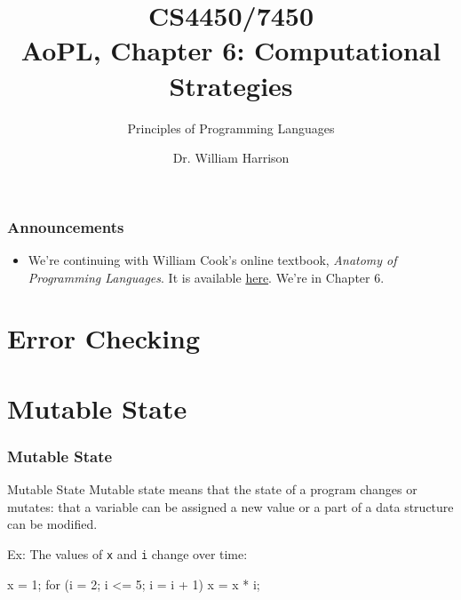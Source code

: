 \documentclass[xcolor=pdftex,dvipsnames,table]{beamer}
\title[CS4450]{CS4450/7450\\AoPL, Chapter 6: Computational Strategies}
\subtitle{Principles of Programming Languages}
\author[Bill Harrison]{Dr. William Harrison}
\institute{University of Missouri}
\begin{document}
\frame{\titlepage}


\begin{frame}[fragile]
\frametitle{Announcements}

\begin{itemize}

\item We're continuing with William Cook's online textbook, \emph{Anatomy of Programming Languages}. It is available
\href{https://www.cs.utexas.edu/~wcook/anatomy/}{here}. We're in Chapter 6.

\end{itemize}

\end{frame}


\section{Error Checking}


\section{Mutable State}

\begin{frame}[fragile]
\frametitle{Mutable State}

\begin{block}{Mutable State}
Mutable state means that the state of a program changes or mutates: that a variable can be assigned a new value or a part of a data structure can be modified.
\end{block}

\vfill

Ex: The values of {\tt x} and {\tt i} change over time:
\begin{hcode}
x = 1;
for (i = 2; i <= 5; i = i + 1) {
  x = x * i;
}
\end{hcode}


\end{frame}
\end{document}
